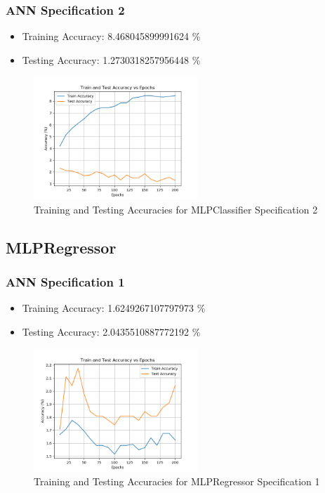 \documentclass[12pt]{article}
\begin{document}
\subsubsection{ANN Specification 2}
\begin{itemize}
	\item Training Accuracy: 8.468045899991624 \%
	\item Testing Accuracy: 1.2730318257956448 \%
\end{itemize}
\begin{figure}[H]
	\centering
	\includegraphics[width=0.55\textwidth]{scikit_learn_model_2_accuracy_comparison.png}
	\caption{Training and Testing Accuracies for MLPClassifier Specification 2}
	\label{fig:mlp2}
\end{figure}
\subsection{MLPRegressor}
\subsubsection{ANN Specification 1}
\begin{itemize}
	\item Training Accuracy: 1.6249267107797973 \%
	\item Testing Accuracy: 2.0435510887772192 \%
\end{itemize}
\begin{figure}[H]
	\centering
	\includegraphics[width=0.55\textwidth]{scikit_learn_model_3_accuracy_comparison.png}
	\caption{Training and Testing Accuracies for MLPRegressor Specification 1}
	\label{fig:mlpr1}
\end{figure}
\end{document}
